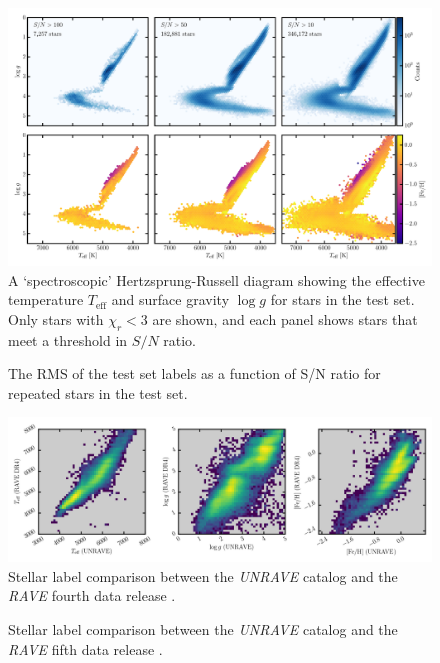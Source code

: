 \documentclass[preprint,trackchanges]{aastex}
\newcommand{\project}[1]{\textsl{#1}}
\newcommand{\teff}{T_{\mathrm{eff}}}
\newcommand{\logg}{\log g}
\begin{document}
\begin{figure}[p]
\includegraphics[width=\textwidth]{figures/hrd-test-set.pdf}
\caption{A `spectroscopic' Hertzsprung-Russell diagram showing the effective temperature $\teff$ and surface gravity $\logg$ for stars in the test set.  Only stars with $\chi_r < 3$ are shown, and each panel shows stars that meet a threshold in $S/N$ ratio.\label{fig:test-set-hrd}}
\end{figure}

\begin{figure}[p]
\caption{The RMS of the test set labels as a function of S/N ratio for repeated stars in the test set.\label{fig:test-set-repeats}}
\end{figure}

\begin{figure}[p]
\includegraphics[width=\textwidth]{figures/dr4-comparison.png}
\caption{Stellar label comparison between the \project{UNRAVE} catalog and the \project{RAVE} fourth data release \citep{Kordopatis_2013}.\label{fig:rave-dr4-comparison}}
\end{figure}


\begin{figure}[p]
\caption{Stellar label comparison between the \project{UNRAVE} catalog and the \project{RAVE} fifth data release \citep{Kunder_2016}.\label{fig:rave-dr5-comparison}}
\end{figure}
\end{document}

